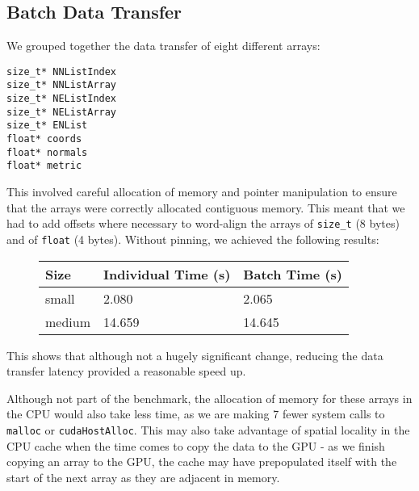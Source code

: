 \subsection*{Batch Data Transfer}
We grouped together the data transfer of eight different arrays:
\begin{verbatim}
size_t* NNListIndex
size_t* NNListArray
size_t* NEListIndex
size_t* NEListArray
size_t* ENList
float* coords
float* normals
float* metric
\end{verbatim}

This involved careful allocation of memory and pointer manipulation to ensure that the arrays were correctly allocated contiguous memory. This meant that we had to add offsets where necessary to word-align the arrays of \verb!size_t! (8 bytes) and of \verb!float! (4 bytes). Without pinning, we achieved the following results:

\begin{figure}[H]\centering \begin{tabular}{ l | l | l}
  \hline
  Size & Individual Time (s) & Batch Time (s)\\
  \hline
  \hline
  small & 2.080 & 2.065 \\
  medium & 14.659 & 14.645 \\
  \hline
\end{tabular} \end{figure}

This shows that although not a hugely significant change, reducing the data transfer latency provided a reasonable speed up.

Although not part of the benchmark, the allocation of memory for these arrays in the CPU would also take less time, as we are making 7 fewer system calls to \verb!malloc! or \verb!cudaHostAlloc!. This may also take advantage of spatial locality in the CPU cache when the time comes to copy the data to the GPU - as we finish copying an array to the GPU, the cache may have prepopulated itself with the start of the next array as they are adjacent in memory. %